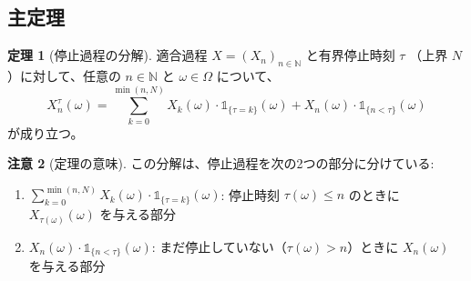 \documentclass[a4paper,12pt]{ltjsarticle}
\theoremstyle{definition}
\newtheorem{theorem}{定理}[section]
\newtheorem{remark}[theorem]{注意}
\begin{document}
\subsection{主定理}

\begin{theorem}[停止過程の分解]
\label{thm:main_decomposition}
適合過程 $X = (X_n)_{n \in \mathbb{N}}$ と有界停止時刻 $\tau$ （上界 $N$）に対して、任意の $n \in \mathbb{N}$ と $\omega \in \Omega$ について、
\begin{equation}
\label{eq:main_decomposition}
X^\tau_n(\omega) = \sum_{k=0}^{\min(n, N)} X_k(\omega) \cdot \mathbb{1}_{\{\tau = k\}}(\omega) + X_n(\omega) \cdot \mathbb{1}_{\{n < \tau\}}(\omega)
\end{equation}
が成り立つ。
\end{theorem}

\begin{remark}[定理の意味]
この分解は、停止過程を次の2つの部分に分けている:
\begin{enumerate}
\item $\sum_{k=0}^{\min(n, N)} X_k(\omega) \cdot \mathbb{1}_{\{\tau = k\}}(\omega)$: 停止時刻 $\tau(\omega) \leq n$ のときに $X_{\tau(\omega)}(\omega)$ を与える部分
\item $X_n(\omega) \cdot \mathbb{1}_{\{n < \tau\}}(\omega)$: まだ停止していない（$\tau(\omega) > n$）ときに $X_n(\omega)$ を与える部分
\end{enumerate}
\end{remark}
\end{document}
